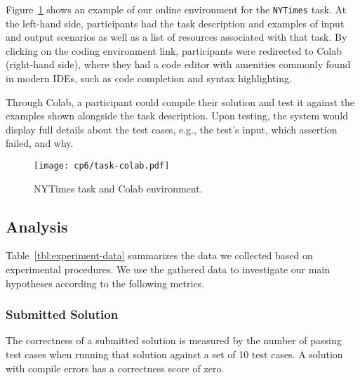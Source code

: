 {Figure~\ref{fig:nytimes-task-colab} shows an example of our online environment for the \texttt{NYTimes} task.
At the left-hand side, participants had the task description and examples of input and output scenarios as well as a list of resources associated with that task. 
By clicking on the coding environment link, participants were redirected to Colab (right-hand side),
where they had a code editor with amenities commonly found in modern IDEs, such as code completion and syntax highlighting. 



Through Colab, a participant could compile their solution and test it against the examples shown alongside the task description.
Upon testing, the system would display full details about the test cases, e.g., the test's input, which assertion failed, and why. 




\clearpage

\begin{landscape}
\begin{figure}
    \centering
    \texttt{[image: cp6/task-colab.pdf]}
    \caption{NYTimes task and Colab environment.}
    \label{fig:nytimes-task-colab}
\end{figure}
\end{landscape}

\clearpage


\subsection{Analysis}



Table~\ref{tbl:experiment-data} summarizes the data we collected based on experimental procedures.
We use the gathered data to investigate our main hypotheses according to the following metrics.






\subsubsection{Submitted Solution}

 
The correctness of a submitted solution is measured by the number of passing test cases
when running that solution against a set of 10 test cases. 
A solution with compile errors has a correctness score of zero.


\smallskip
\begin{small}



\end{small}}
